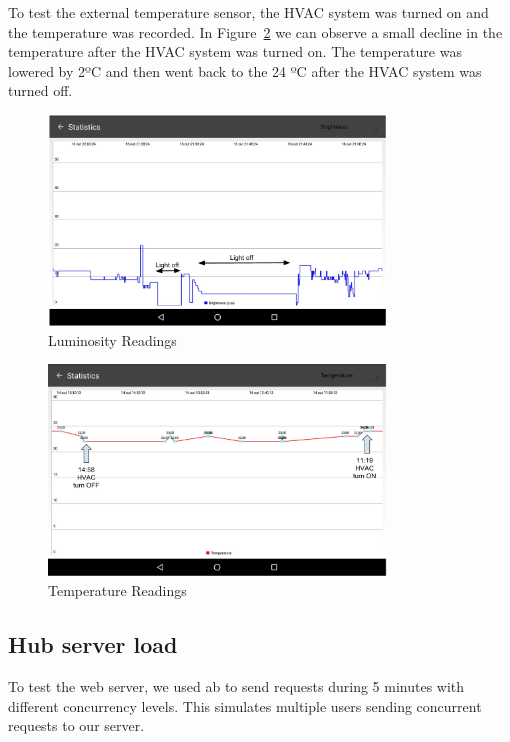 To test the external temperature sensor, the HVAC system was turned on and the temperature was recorded. In Figure~\ref{eval:temp} we can observe a small decline in the temperature after the HVAC system was turned on. The temperature was lowered by 2ºC and then went back to the 24 ºC after the HVAC system was turned off.

\begin{figure}[]
\centering
\includegraphics[width=0.8\textwidth]{Figures/eval_lights}
\caption{Luminosity Readings}
\label{eval:lights}
\end{figure}

\begin{figure}[]
\centering
\includegraphics[width=0.8\textwidth]{Figures/eval_temp}
\caption{Temperature Readings}
\label{eval:temp}
\end{figure}


\subsection{Hub server load}

To test the web server, we used \ac{ab} to send requests during 5 minutes with different concurrency levels. This simulates multiple users sending concurrent requests to our server.

